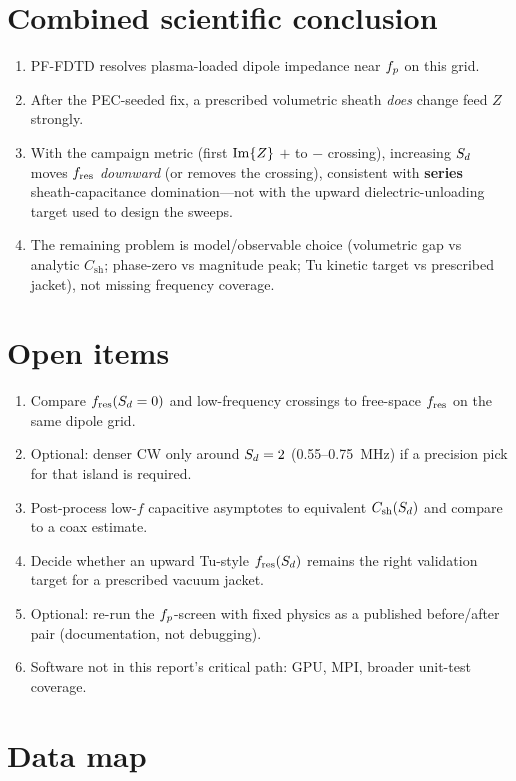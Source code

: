 \section{Combined scientific conclusion}

\begin{enumerate}[leftmargin=1.5em]
\item PF-FDTD resolves plasma-loaded dipole impedance near \(f_p\) on this grid.
\item After the PEC-seeded fix, a prescribed volumetric sheath \emph{does} change feed \(Z\) strongly.
\item With the campaign metric (first \(\operatorname{Im}\{Z\}\) \(+\) to \(-\) crossing), increasing \(S_d\) moves \(f_{\mathrm{res}}\) \emph{downward} (or removes the crossing), consistent with \textbf{series} sheath-capacitance domination---not with the upward dielectric-unloading target used to design the sweeps.
\item The remaining problem is model/observable choice (volumetric gap vs analytic \(C_{\mathrm{sh}}\); phase-zero vs magnitude peak; Tu kinetic target vs prescribed jacket), not missing frequency coverage.
\end{enumerate}

\section{Open items}

\begin{enumerate}[leftmargin=1.5em]
\item Compare \(f_{\mathrm{res}}(S_d=0)\) and low-frequency crossings to free-space \(f_{\mathrm{res}}\) on the same dipole grid.
\item Optional: denser CW only around \(S_d=2\) (0.55--0.75~MHz) if a precision pick for that island is required.
\item Post-process low-\(f\) capacitive asymptotes to equivalent \(C_{\mathrm{sh}}(S_d)\) and compare to a coax estimate.
\item Decide whether an upward Tu-style \(f_{\mathrm{res}}(S_d)\) remains the right validation target for a prescribed vacuum jacket.
\item Optional: re-run the \(f_p\)-screen with fixed physics as a published before/after pair (documentation, not debugging).
\item Software not in this report's critical path: GPU, MPI, broader unit-test coverage.
\end{enumerate}

\section{Data map}

